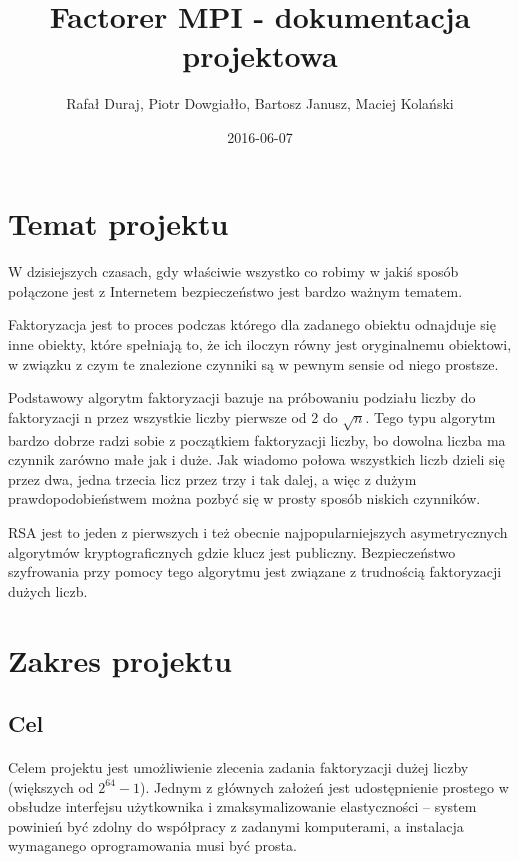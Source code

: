 \documentclass{article}
\title{Factorer MPI - dokumentacja projektowa}
\date{2016-06-07}
\author{Rafał Duraj, Piotr Dowgiałło, Bartosz Janusz, Maciej Kolański}
\begin{document}

\newpage  
{}

\tableofcontents
\newpage

\section{Temat projektu}

\paragraph{}W dzisiejszych czasach, gdy właściwie wszystko co robimy w jakiś sposób połączone jest z Internetem bezpieczeństwo jest bardzo ważnym tematem.

Faktoryzacja jest to proces podczas którego dla zadanego obiektu odnajduje się inne obiekty, które spełniają to, że ich iloczyn równy jest oryginalnemu obiektowi, w związku z czym te znalezione czynniki są w pewnym sensie od niego prostsze.

Podstawowy algorytm faktoryzacji bazuje na próbowaniu podziału liczby do faktoryzacji n przez wszystkie liczby pierwsze od 2 do $\sqrt{n}$. Tego typu algorytm bardzo dobrze radzi sobie z początkiem faktoryzacji liczby, bo dowolna liczba ma czynnik zarówno małe jak i duże. Jak wiadomo połowa wszystkich liczb dzieli się przez dwa, jedna trzecia licz przez trzy i tak dalej, a więc z dużym prawdopodobieństwem można pozbyć się w prosty sposób niskich czynników.

RSA jest to jeden z pierwszych i też obecnie najpopularniejszych asymetrycznych algorytmów kryptograficznych gdzie klucz jest publiczny. Bezpieczeństwo szyfrowania przy pomocy tego algorytmu jest związane z trudnością faktoryzacji dużych liczb.

\section{Zakres projektu}
\subsection{Cel}

\paragraph{}Celem projektu jest umożliwienie zlecenia zadania faktoryzacji dużej liczby (większych od $2^{64} -1$). Jednym z głównych założeń jest udostępnienie prostego w obsłudze interfejsu użytkownika i zmaksymalizowanie elastyczności – system powinień być zdolny do współpracy z zadanymi komputerami, a instalacja wymaganego oprogramowania musi być prosta. 
\end{document}
